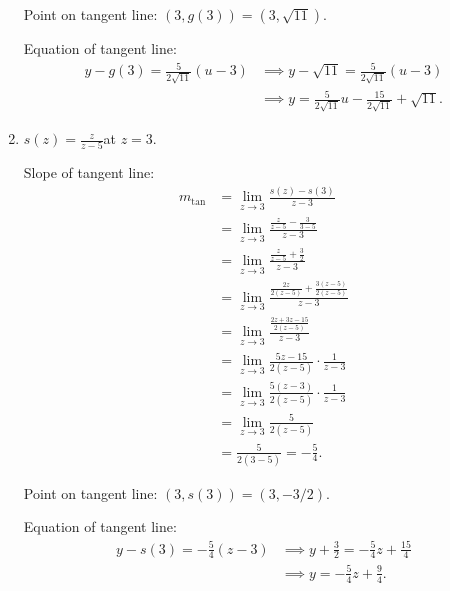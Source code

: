 \documentclass[nooutcomes,handout]{ximera}
\begin{document}
\begin{problem}
\begin{enumerate}
\begin{freeResponse}
        Point on tangent line: $(3, g(3)) = (3, \sqrt{11})$.

        Equation of tangent line:
        \begin{align*}
          y - g(3) = \frac{5}{2\sqrt{11}}(u-3)
          &\implies y - \sqrt{11} = \frac{5}{2\sqrt{11}}(u - 3)\\
          &\implies y = \frac{5}{2\sqrt{11}}u - \frac{15}{2\sqrt{11}} + \sqrt{11}.
        \end{align*}
      \end{freeResponse}

    \item
      $\displaystyle s(z) = \frac{z}{z-5}$\quad at $z = 3$.
      \begin{freeResponse}
        Slope of tangent line:
        \begin{align*}
          m_{\mathrm{tan}}
          &= \lim_{z \to 3} \frac{s(z) - s(3)}{z-3}  \\
		&= \lim_{z \to 3} \frac{\frac{z}{z-5} - \frac{3}{3-5}}{z-3}  \\
		&= \lim_{z \to 3} \frac{\frac{z}{z-5} + \frac{3}{2}}{z-3}  \\
		&= \lim_{z \to 3} \frac{\frac{2z}{2(z-5)} + \frac{3(z-5)}{2(z-5)}}{z-3}  \\
		&= \lim_{z \to 3} \frac{\frac{2z + 3z - 15}{2(z-5)}}{z-3}  \\
		&= \lim_{z \to 3} \frac{5z-15}{2(z-5)} \cdot \frac{1}{z-3}  \\
		&= \lim_{z \to 3} \frac{5(z-3)}{2(z-5)} \cdot \frac{1}{z-3}  \\
		&= \lim_{z \to 3} \frac{5}{2(z-5)}  \\
		&= \frac{5}{2(3-5)} = -\frac{5}{4}.
	\end{align*}

        Point on tangent line: $(3, s(3)) = (3, -3/2)$.

        Equation of tangent line:
        \begin{align*}
          y - s(3) = - \frac{5}{4}(z-3) &\implies y + \frac{3}{2} = - \frac{5}{4}z + \frac{15}{4}\\
          &\implies y = - \frac{5}{4} z + \frac{9}{4}.
        \end{align*}
      \end{freeResponse}
  \end{enumerate}
\end{problem}
\end{document}
